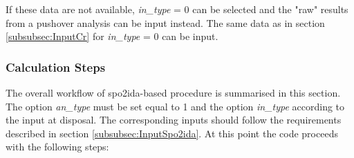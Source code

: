 If these data are not available, \textit{in\_type} = 0 can be selected and the "raw" results from a pushover analysis can be input instead. The same data as in section \ref{subsubsec:InputCr} for \textit{in\_type} = 0 can be input.

\subsubsection{Calculation Steps}
The overall workflow of spo2ida-based procedure is summarised in this section. The option \textit{an\_type} must be set equal to 1 and the option \textit{in\_type} according to the input at disposal. The corresponding inputs should follow the requirements described in section \ref{subsubsec:InputSpo2ida}. At this point the code proceeds with the following steps:

